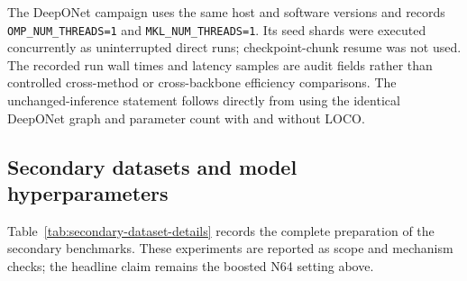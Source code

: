The DeepONet campaign uses the same host and software versions and records
\texttt{OMP\_NUM\_THREADS=1} and \texttt{MKL\_NUM\_THREADS=1}.  Its seed shards
were executed concurrently as uninterrupted direct runs; checkpoint-chunk resume
was not used.  The recorded run wall times and latency samples
are audit fields rather than controlled cross-method or cross-backbone efficiency
comparisons.  The unchanged-inference statement follows directly from using the
identical DeepONet graph and parameter count with and without LOCO.

\subsection{Secondary datasets and model hyperparameters}

Table~\ref{tab:secondary-dataset-details} records the complete preparation of the
secondary benchmarks.  These experiments are reported as scope and mechanism
checks; the headline claim remains the boosted N64 setting above.

